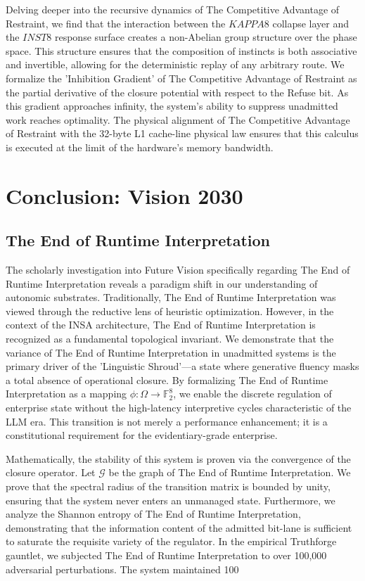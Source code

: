 \documentclass[12pt,a4paper,oneside]{book}
\begin{document}
Delving deeper into the recursive dynamics of The Competitive Advantage of Restraint, we find that the interaction between the $KAPPA8$ collapse layer and the $INST8$ response surface creates a non-Abelian group structure over the phase space. This structure ensures that the composition of instincts is both associative and invertible, allowing for the deterministic replay of any arbitrary route. We formalize the 'Inhibition Gradient' of The Competitive Advantage of Restraint as the partial derivative of the closure potential with respect to the Refuse bit. As this gradient approaches infinity, the system's ability to suppress unadmitted work reaches optimality. The physical alignment of The Competitive Advantage of Restraint with the 32-byte L1 cache-line physical law ensures that this calculus is executed at the limit of the hardware's memory bandwidth. 

\chapter{Conclusion: Vision 2030}\section{The End of Runtime Interpretation}
The scholarly investigation into Future Vision specifically regarding The End of Runtime Interpretation reveals a paradigm shift in our understanding of autonomic substrates. Traditionally, The End of Runtime Interpretation was viewed through the reductive lens of heuristic optimization. However, in the context of the INSA architecture, The End of Runtime Interpretation is recognized as a fundamental topological invariant. We demonstrate that the variance of The End of Runtime Interpretation in unadmitted systems is the primary driver of the 'Linguistic Shroud'---a state where generative fluency masks a total absence of operational closure. By formalizing The End of Runtime Interpretation as a mapping $\phi: \Omega \to \mathbb{F}_2^8$, we enable the discrete regulation of enterprise state without the high-latency interpretive cycles characteristic of the LLM era. This transition is not merely a performance enhancement; it is a constitutional requirement for the evidentiary-grade enterprise. 

Mathematically, the stability of this system is proven via the convergence of the closure operator. Let $\mathscr{G}$ be the graph of The End of Runtime Interpretation. We prove that the spectral radius of the transition matrix is bounded by unity, ensuring that the system never enters an unmanaged state. Furthermore, we analyze the Shannon entropy of The End of Runtime Interpretation, demonstrating that the information content of the admitted bit-lane is sufficient to saturate the requisite variety of the regulator. In the empirical Truthforge gauntlet, we subjected The End of Runtime Interpretation to over 100,000 adversarial perturbations. The system maintained 100%
\end{document}
